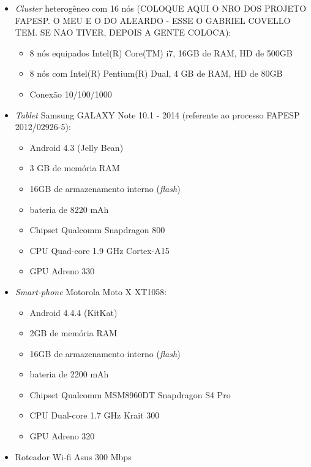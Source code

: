     \begin{itemize}
    
    \item \textit{Cluster} heterogêneo com 16 nós (COLOQUE AQUI O NRO DOS PROJETO FAPESP.  O MEU E O DO ALEARDO - ESSE O GABRIEL COVELLO TEM. SE NAO TIVER, DEPOIS A GENTE COLOCA):
    
        \begin{itemize}
        \item 8 nós equipados Intel(R) Core(TM) i7, 16GB de RAM, HD de 500GB
        \item 8 nós com Intel(R) Pentium(R) Dual, 4 GB de RAM, HD de 80GB
        \item Conexão 10/100/1000
        \end{itemize}
        
    \item \textit{Tablet} Samsung GALAXY Note 10.1 - 2014 (referente ao processo FAPESP 2012/02926-5):
        
        \begin{itemize}
            \item Android 4.3 (Jelly Bean)
            \item 3 GB de memória RAM
            \item 16GB de armazenamento interno (\textit{flash})
            \item bateria de 8220 mAh
            \item Chipset Qualcomm Snapdragon 800
            \item CPU Quad-core 1.9 GHz Cortex-A15
            \item GPU Adreno 330
        \end{itemize}
        
    \item \textit{Smart-phone} Motorola Moto X XT1058:
    
        \begin{itemize}
            \item Android  4.4.4 (KitKat)
            \item 2GB de memória RAM
            \item 16GB de armazenamento interno (\textit{flash})
            \item bateria de 2200 mAh
            \item Chipset Qualcomm MSM8960DT Snapdragon S4 Pro
            \item CPU Dual-core 1.7 GHz Krait 300
            \item GPU Adreno 320
            
        \end{itemize}
        
    \item Roteador Wi-fi Asus 300 Mbps
    
    \end{itemize}
    
